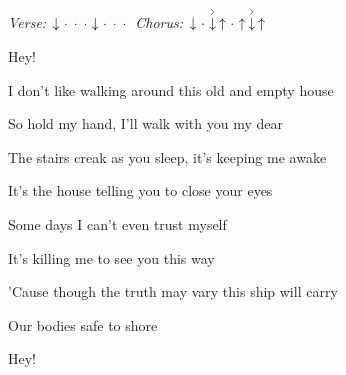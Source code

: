 \begin{song}


\begin{headerbox}
\textit{Verse:} $\Down\Miss\Miss\Miss\Down\Miss\Miss\Miss$ \quad
\textit{Chorus:} $\Down\Miss\AccentDown\Up\Miss\Up\AccentDown\Up$
\end{headerbox}

\begin{vchordbox}
\end{vchordbox}

\normalsize

\bigskip

 \par
\Intro {}   Hey!  \par

\bigskip

 \par
{}I don't like walking around this old and empty house \par
So hold my hand, I'll walk with you my dear \par
The stairs creak as you sleep, it's keeping me awake \par
It's the house telling you to close your eyes \par

\bigskip

 \par
{}Some days I can't even  trust myself \par
It's killing me to see you this way \par
'Cause though the truth may vary this  ship will carry \par
{} \par
Our bodies safe to shore  \par

\bigskip

 \par
{}   Hey!  \par

\bigskip


\end{song}
